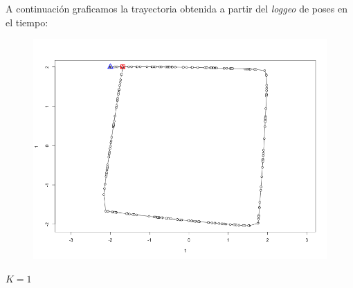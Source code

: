 A continuación graficamos la trayectoria obtenida a partir del \textit{loggeo} de poses en el tiempo: 

\begin{figure}[!htb]
\begin{center}
\includegraphics[width=\linewidth/2]{imagenesTrayectorias/lazocerrado/lazocerrado04.png}
\end{center}
\end{figure}
\FloatBarrier

$K = 1$



